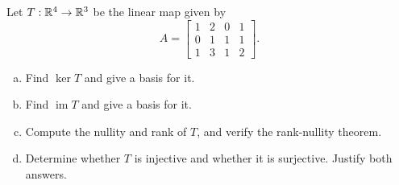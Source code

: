 \begin{exercise}
  \label{ex:hw04:kernel-image-and-rank}
  Let \(T:\mathbb{R}^4\to\mathbb{R}^3\) be the linear map given by
  \[
    A=\begin{bmatrix}
      1&2&0&1\\
      0&1&1&1\\
      1&3&1&2
    \end{bmatrix}.
  \]
  \begin{enumerate}[(a)][2]
    \item Find \(\ker T\) and give a basis for it.
    \item Find \(\operatorname{im}T\) and give a basis for it.
    \item Compute the nullity and rank of \(T\), and verify the
      rank-nullity theorem.
    \item Determine whether \(T\) is injective and whether it is
      surjective. Justify both answers.
  \end{enumerate}
\end{exercise}
